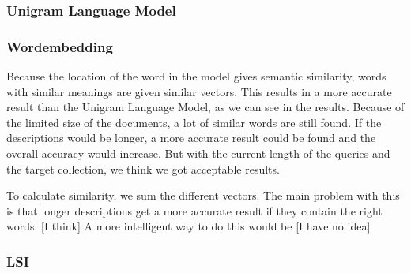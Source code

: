 \subsubsection{Unigram Language Model}


\subsubsection{Wordembedding}
Because the location of the word in the model gives semantic similarity, words with similar meanings are given similar vectors. This results in a more accurate result than the Unigram Language Model, as we can see in the results.
Because of the limited size of the documents, a lot of similar words are still found. If the descriptions would be longer, a more accurate result could be found and the overall accuracy would increase. But with the current length of the queries and the target collection, we think we got acceptable results.

To calculate similarity, we sum the different vectors. The main problem with this is that longer descriptions get a more accurate result if they contain the right words.  [I think]
A more intelligent way to do this would be [I have no idea]


\subsubsection{LSI}
